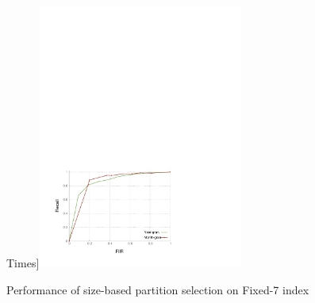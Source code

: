 \begin{figure}
  Times]{\label{fig:vary_time_nyt_pse_fixed_7d}\includegraphics[width=0.60\textwidth]{plots/selection/cc_results/round2/pdf/nyt-time-interval-granularity-pse.pdf}}
  
  \caption{Performance of size-based partition selection on Fixed-7 index}
  \label{fig:pse_query_times}
\end{figure}

